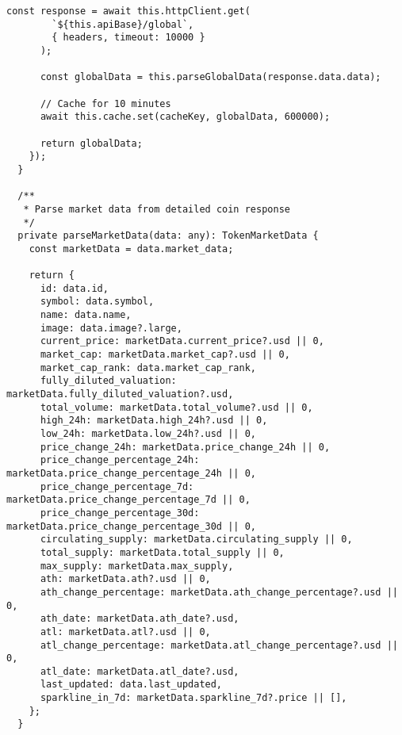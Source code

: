\documentclass[11pt,a4paper]{article}
\begin{document}
\begin{lstlisting}[style=typescript, caption=CoinGecko Service for Market Data]
      const response = await this.httpClient.get(
        `${this.apiBase}/global`,
        { headers, timeout: 10000 }
      );

      const globalData = this.parseGlobalData(response.data.data);
      
      // Cache for 10 minutes
      await this.cache.set(cacheKey, globalData, 600000);
      
      return globalData;
    });
  }

  /**
   * Parse market data from detailed coin response
   */
  private parseMarketData(data: any): TokenMarketData {
    const marketData = data.market_data;
    
    return {
      id: data.id,
      symbol: data.symbol,
      name: data.name,
      image: data.image?.large,
      current_price: marketData.current_price?.usd || 0,
      market_cap: marketData.market_cap?.usd || 0,
      market_cap_rank: data.market_cap_rank,
      fully_diluted_valuation: marketData.fully_diluted_valuation?.usd,
      total_volume: marketData.total_volume?.usd || 0,
      high_24h: marketData.high_24h?.usd || 0,
      low_24h: marketData.low_24h?.usd || 0,
      price_change_24h: marketData.price_change_24h || 0,
      price_change_percentage_24h: marketData.price_change_percentage_24h || 0,
      price_change_percentage_7d: marketData.price_change_percentage_7d || 0,
      price_change_percentage_30d: marketData.price_change_percentage_30d || 0,
      circulating_supply: marketData.circulating_supply || 0,
      total_supply: marketData.total_supply || 0,
      max_supply: marketData.max_supply,
      ath: marketData.ath?.usd || 0,
      ath_change_percentage: marketData.ath_change_percentage?.usd || 0,
      ath_date: marketData.ath_date?.usd,
      atl: marketData.atl?.usd || 0,
      atl_change_percentage: marketData.atl_change_percentage?.usd || 0,
      atl_date: marketData.atl_date?.usd,
      last_updated: data.last_updated,
      sparkline_in_7d: marketData.sparkline_7d?.price || [],
    };
  }


\end{lstlisting}
\end{document}
